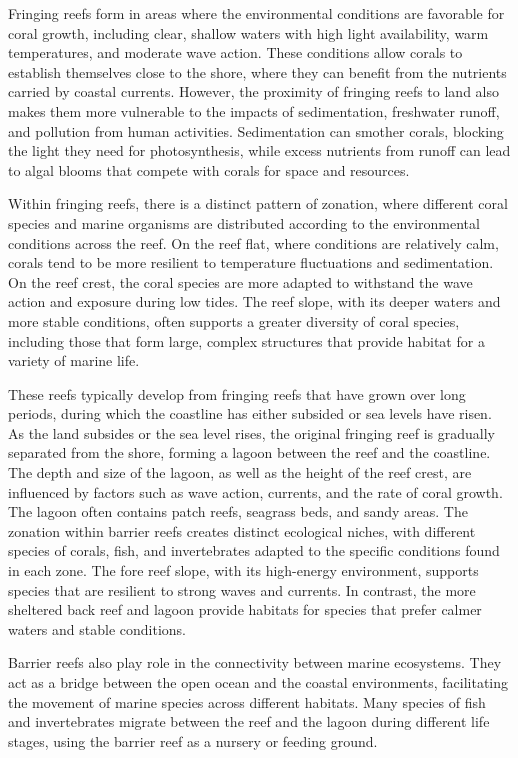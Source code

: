 Fringing reefs form in areas where the environmental conditions are favorable for coral growth, including clear, shallow waters with high light availability, warm temperatures, and moderate wave action. These conditions allow corals to establish themselves close to the shore, where they can benefit from the nutrients carried by coastal currents. However, the proximity of fringing reefs to land also makes them more vulnerable to the impacts of sedimentation, freshwater runoff, and pollution from human activities. Sedimentation can smother corals, blocking the light they need for photosynthesis, while excess nutrients from runoff can lead to algal blooms that compete with corals for space and resources.

Within fringing reefs, there is a distinct pattern of zonation, where different coral species and marine organisms are distributed according to the environmental conditions across the reef. On the reef flat, where conditions are relatively calm, corals tend to be more resilient to temperature fluctuations and sedimentation. On the reef crest, the coral species are more adapted to withstand the wave action and exposure during low tides. The reef slope, with its deeper waters and more stable conditions, often supports a greater diversity of coral species, including those that form large, complex structures that provide habitat for a variety of marine life.

These reefs typically develop from fringing reefs that have grown over long periods, during which the coastline has either subsided or sea levels have risen. As the land subsides or the sea level rises, the original fringing reef is gradually separated from the shore, forming a lagoon between the reef and the coastline.
The depth and size of the lagoon, as well as the height of the reef crest, are influenced by factors such as wave action, currents, and the rate of coral growth. The lagoon often contains patch reefs, seagrass beds, and sandy areas. The zonation within barrier reefs creates distinct ecological niches, with different species of corals, fish, and invertebrates adapted to the specific conditions found in each zone. The fore reef slope, with its high-energy environment, supports species that are resilient to strong waves and currents. In contrast, the more sheltered back reef and lagoon provide habitats for species that prefer calmer waters and stable conditions.

Barrier reefs also play role in the connectivity between marine ecosystems. They act as a bridge between the open ocean and the coastal environments, facilitating the movement of marine species across different habitats. Many species of fish and invertebrates migrate between the reef and the lagoon during different life stages, using the barrier reef as a nursery or feeding ground.

